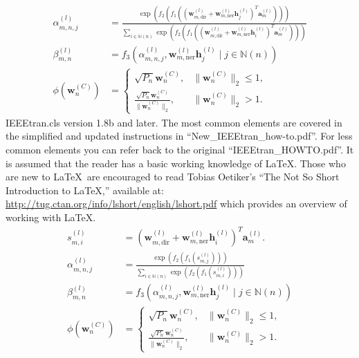 \documentclass[lettersize,journal]{IEEEtran}
\begin{document}
{\footnotesize
\begin{align}
\alpha_{m,n,j}^{(l)} &= \frac{\exp\left(f_2\left(f_1\left((\bm{w}_{m,\text{dir}}^{(l)} + \bm{w}_{m,\text{ner}}^{(l)}\bm{h}_j^{(l)})^T \bm{a}_m^{(l)}\right)\right)\right)}{\sum_{i \in \mathbb{N}(n)} \exp\left(f_2\left(f_1\left((\bm{w}_{m,\text{dir}}^{(l)} + \bm{w}_{m,\text{ner}}^{(l)}\bm{h}_i^{(l)})^T \bm{a}_m^{(l)}\right)\right)\right)} \label{eq:alpha} \\
\beta_{m,n}^{(l)} &= f_3\left(\alpha_{m,n,j}^{(l)}, \bm{w}_{m,\text{ner}}^{(l)}\bm{h}_j^{(l)} \mid j \in \mathbb{N}(n)\right) \label{eq:beta} \\
\phi(\bm{w}_n^{(C)}) &= \begin{cases}
\sqrt{P_n} \bm{w}_n^{(C)}, & \|\bm{w}_n^{(C)}\|_2 \le 1, \\
\frac{\sqrt{P_n} \bm{w}_n^{(C)}}{\|\bm{w}_n^{(C)}\|_2}, & \|\bm{w}_n^{(C)}\|_2 > 1.
\end{cases} \label{eq:phi}
\end{align}
}
IEEEtran.cls version 1.8b and later. The most common elements are covered in the simplified and updated instructions in ``New\_IEEEtran\_how-to.pdf''. For less common elements you can refer back to the original ``IEEEtran\_HOWTO.pdf''. It is assumed that the reader has a basic working knowledge of \LaTeX. Those who are new to \LaTeX \ are encouraged to read Tobias Oetiker's ``The Not So Short Introduction to \LaTeX ,'' available at: \url{http://tug.ctan.org/info/lshort/english/lshort.pdf} which provides an overview of working with \LaTeX.
\begin{align}
s_{m,i}^{(l)} &= (\bm{w}_{m,\text{dir}}^{(l)} + \bm{w}_{m,\text{ner}}^{(l)}\bm{h}_i^{(l)})^T \bm{a}_m^{(l)}. \label{eq:s_def} \\
\alpha_{m,n,j}^{(l)} &= \frac{\exp\left(f_2\left(f_1\left(s_{m,j}^{(l)}\right)\right)\right)}{\sum_{i \in \mathbb{N}(n)} \exp\left(f_2\left(f_1\left(s_{m,i}^{(l)}\right)\right)\right)} \label{eq:alpha_new} \\
\beta_{m,n}^{(l)} &= f_3\left(\alpha_{m,n,j}^{(l)}, \bm{w}_{m,\text{ner}}^{(l)}\bm{h}_j^{(l)} \mid j \in \mathbb{N}(n)\right) \label{eq:beta_repeat} \\
\phi(\bm{w}_n^{(C)}) &= \begin{cases}
\sqrt{P_n} \bm{w}_n^{(C)}, & \|\bm{w}_n^{(C)}\|_2 \le 1, \\
\frac{\sqrt{P_n} \bm{w}_n^{(C)}}{\|\bm{w}_n^{(C)}\|_2}, & \|\bm{w}_n^{(C)}\|_2 > 1.
\end{cases} \label{eq:phi_repeat}
\end{align}
\end{document}
